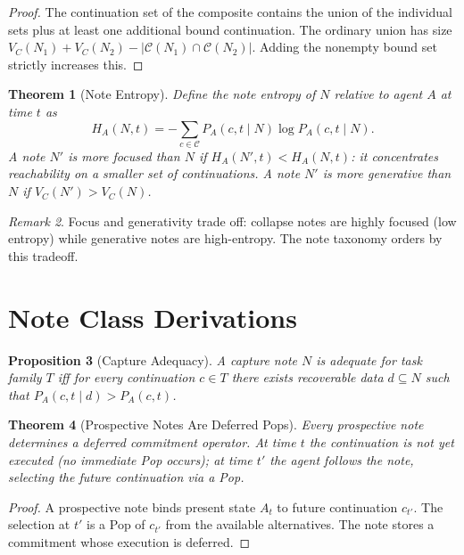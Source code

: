 \documentclass[12pt, a4paper, openany]{book}
\theoremstyle{plain}
\newtheorem{theorem}{Theorem}[chapter]
\newtheorem{proposition}[theorem]{Proposition}
\theoremstyle{definition}
\theoremstyle{remark}
\newtheorem{remark}[theorem]{Remark}
\newcommand{\calC}{\mathcal{C}}
\begin{document}
\begin{proof}
The continuation set of the composite contains the union of the individual sets
plus at least one additional bound continuation. The ordinary union has size
$V_C(N_1) + V_C(N_2) - |\calC(N_1) \cap \calC(N_2)|$. Adding the nonempty
bound set strictly increases this.
\end{proof}

\begin{theorem}[Note Entropy]
Define the \emph{note entropy} of $N$ relative to agent $A$ at time $t$ as
\[
H_A(N, t) = -\sum_{c \in \calC} P_A(c, t \mid N) \log P_A(c, t \mid N).
\]
A note $N'$ is more \emph{focused} than $N$ if $H_A(N', t) < H_A(N, t)$: it
concentrates reachability on a smaller set of continuations. A note $N'$ is more
\emph{generative} than $N$ if $V_C(N') > V_C(N)$.
\end{theorem}

\begin{remark}
Focus and generativity trade off: collapse notes are highly focused (low entropy)
while generative notes are high-entropy. The note taxonomy orders by this tradeoff.
\end{remark}

\section{Note Class Derivations}

\begin{proposition}[Capture Adequacy]
A capture note $N$ is adequate for task family $T$ iff for every continuation
$c \in T$ there exists recoverable data $d \subseteq N$ such that
$P_A(c, t \mid d) > P_A(c, t)$.
\end{proposition}

\begin{theorem}[Prospective Notes Are Deferred Pops]
Every prospective note determines a deferred commitment operator. At time $t$
the continuation is not yet executed (no immediate Pop occurs); at time $t'$ the
agent follows the note, selecting the future continuation via a Pop.
\end{theorem}

\begin{proof}
A prospective note binds present state $A_t$ to future continuation $c_{t'}$.
The selection at $t'$ is a Pop of $c_{t'}$ from the available alternatives.
The note stores a commitment whose execution is deferred. \end{proof}
\end{document}
